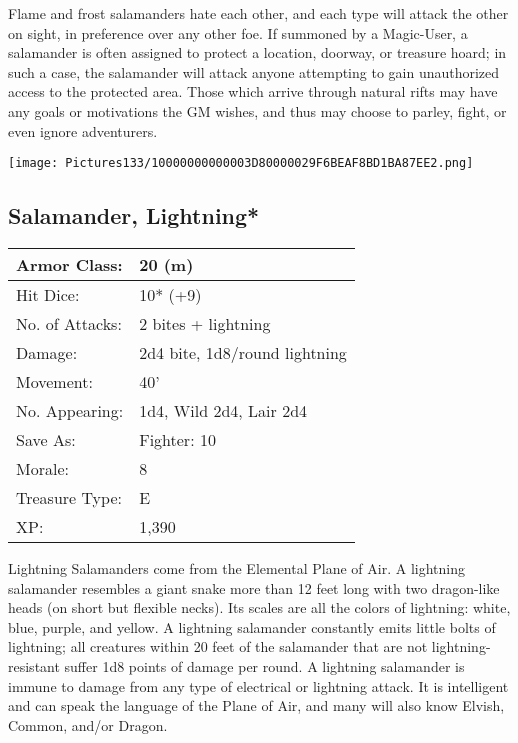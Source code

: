 \documentclass[a4paper,twoside,openany,10pt]{book}
\begin{document}
\begin{multicols}{2}
Flame and frost salamanders hate each other, and each type will attack the other on sight, in preference over any other foe. If summoned by a Magic-User, a salamander is often assigned to protect a location, doorway, or treasure hoard; in such a case, the salamander will attack anyone attempting to gain unauthorized access to the protected area. Those which arrive through natural rifts may have any goals or motivations the GM wishes, and thus may choose to parley, fight, or even ignore adventurers.

\vfill

\begin{center} \texttt{[image: Pictures133/10000000000003D80000029F6BEAF8BD1BA87EE2.png]} \end{center}


\subsection*{Salamander, Lightning*}\label{salamander-lightning}

\begin{tabularx}{0.50\textwidth}{@{}lX@{}}
Armor Class: & 20 (m) \\\hline
Hit Dice: & 10* (+9) \\\hline
No. of Attacks: & 2 bites + lightning \\\hline
Damage: & 2d4 bite, 1d8/round lightning \\\hline
Movement: & 40' \\\hline
No. Appearing: & 1d4, Wild 2d4, Lair 2d4 \\\hline
Save As: & Fighter: 10 \\\hline
Morale: & 8 \\\hline
Treasure Type: & E \\\hline
XP: & 1,390 \\\hline
\end{tabularx}\medskip

Lightning Salamanders come from the Elemental Plane of Air. A lightning salamander resembles a giant snake more than 12 feet long with two dragon-like heads (on short but flexible necks). Its scales are all the colors of lightning: white, blue, purple, and yellow. A lightning salamander constantly emits little bolts of lightning; all creatures within 20 feet of the salamander that are not lightning-resistant suffer 1d8 points of damage per round. A lightning salamander is immune to damage from any type of electrical or lightning attack. It is intelligent and can speak the language of the Plane of Air, and many will also know Elvish, Common, and/or Dragon.


\end{multicols}
\end{document}
